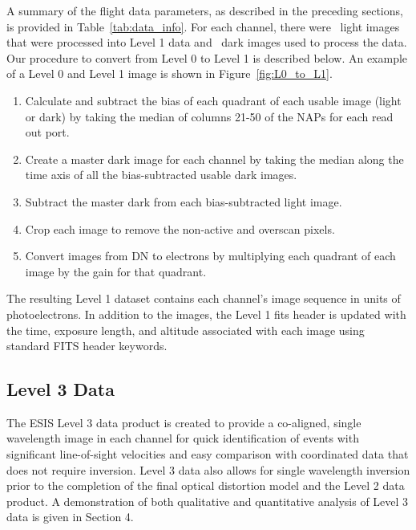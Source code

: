 A summary of the flight data parameters, as described in the preceding sections, is provided in Table~\ref{tab:data_info}. 
For each channel, there were \numDataFrames\ light images that were processed into Level 1 data and \numDarkFrames\ dark images used to process the data.
Our procedure to convert from Level 0 to Level 1 is described below. An example of a Level 0 and Level 1 image is shown in Figure~\ref{fig:L0_to_L1}.

\begin{enumerate}
    \item Calculate and subtract the bias of each quadrant of each usable image (light or dark) by taking the median of columns 21-50 of the NAPs for each read out port.   
    \item Create a master dark image for each channel by taking the median along the time axis of all the bias-subtracted usable dark images.
    \item Subtract the master dark from each bias-subtracted light image.
    \item Crop each image to remove the non-active and overscan pixels.
    \item Convert images from DN to electrons by multiplying each quadrant of each image by the gain for that quadrant.
\end{enumerate}
The resulting Level 1 dataset contains each channel's image sequence in units of photoelectrons.
In addition to the images, the Level 1 fits header is updated with the time, exposure length, and altitude associated with each image using standard FITS header keywords.   
	

\subsection{Level 3 Data} \label{sec:level 3}
 
    
\newcommand{\vigfit}{[.35, 0.28, 0.34, 0.6]}
\newcommand{\levthreetime}{18:08:46}

The ESIS Level 3 data product is created to provide a co-aligned, single wavelength image in each channel for quick identification of events with significant line-of-sight velocities and easy comparison with coordinated data that does not require inversion. 
Level 3 data also allows for single wavelength inversion prior to the completion of the final optical distortion model and the Level 2 data product.  A demonstration of both qualitative and quantitative analysis of Level 3 data is given in Section 4.  

